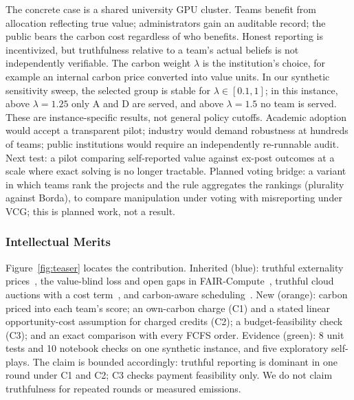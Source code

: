 \noindent
The concrete case is a shared university GPU cluster. Teams benefit from allocation reflecting true value; administrators gain an auditable record; the public bears the carbon cost regardless of who benefits. Honest reporting is incentivized, but truthfulness relative to a team's actual beliefs is not independently verifiable. The carbon weight $\lambda$ is the institution's choice, for example an internal carbon price converted into value units. In our synthetic sensitivity sweep, the selected group is stable for $\lambda\in[0.1,1]$; in this instance, above $\lambda=1.25$ only A and D are served, and above $\lambda=1.5$ no team is served. These are instance-specific results, not general policy cutoffs. Academic adoption would accept a transparent pilot; industry would demand robustness at hundreds of teams; public institutions would require an independently re-runnable audit. Next test: a pilot comparing self-reported value against ex-post outcomes at a scale where exact solving is no longer tractable. Planned voting bridge: a variant in which teams rank the projects and the rule aggregates the rankings (plurality against Borda), to compare manipulation under voting with misreporting under VCG; this is planned work, not a result.

\vspace{3pt}

\subsubsection*{Intellectual Merits}
Figure~\ref{fig:teaser} locates the contribution. Inherited (blue): truthful externality prices~\cite{vickrey1961,clarke1971,groves1973}, the value-blind loss and open gaps in FAIR-Compute~\cite{fair_compute2026}, truthful cloud auctions with a cost term~\cite{zhang2015iaas}, and carbon-aware scheduling~\cite{radovanovic2021carbon}. New (orange): carbon priced into each team's score; an own-carbon charge (C1) and a stated linear opportunity-cost assumption for charged credits (C2); a budget-feasibility check (C3); and an exact comparison with every FCFS order. Evidence (green): 8 unit tests and 10 notebook checks on one synthetic instance, and five exploratory self-plays. The claim is bounded accordingly: truthful reporting is dominant in one round under C1 and C2; C3 checks payment feasibility only. We do not claim truthfulness for repeated rounds or measured emissions.

